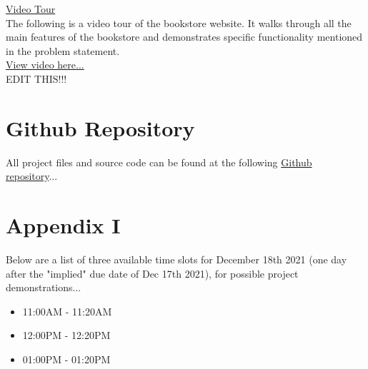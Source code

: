 \documentclass[a4 paper]{article}
\begin{document}
\noindent\underline{Video Tour}\\
The following is a video tour of the bookstore website. It walks through all the main features of the bookstore and demonstrates specific functionality mentioned in the problem statement.\\

\noindent\href{https://www.youtube.com/}{View video here...}\\
EDIT THIS!!!\\

\section{Github Repository}
\noindent All project files and source code can be found at the following \href{https://github.com/COMP3005A-Project/bookstore}{Github repository}...

\section{Appendix I}
Below are a list of three available time slots for December 18th 2021 (one day after the "implied" due date of Dec 17th 2021), for possible project demonstrations...
\begin{itemize}
	\item 11:00AM - 11:20AM
	\item 12:00PM - 12:20PM
	\item 01:00PM - 01:20PM
\end{itemize}
\end{document}
